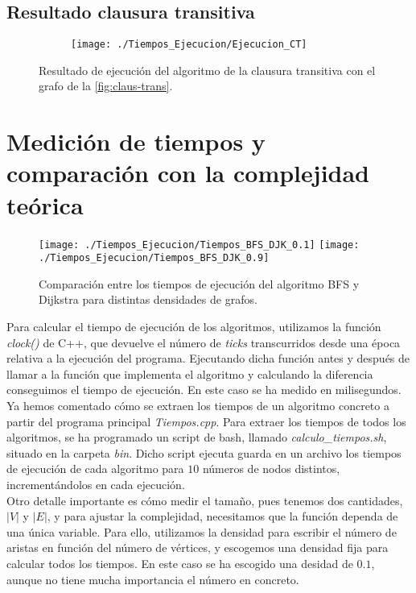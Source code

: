 \subsection{Resultado clausura transitiva}

\begin{figure}[!htb]
	\centering
	\begin{subfigure}{\linewidth}
		\texttt{[image: ./Tiempos\_Ejecucion/Ejecucion\_CT]}
	\end{subfigure}
	
	\caption{Resultado de ejecución del algoritmo de la clausura transitiva con el grafo de la \autoref{fig:claus-trans}.}
	\label{fig:resultado_CT}
\end{figure}

\section{Medición de tiempos y comparación con la complejidad teórica}

\begin{figure}[htb]
	\centering
	\texttt{[image: ./Tiempos\_Ejecucion/Tiempos\_BFS\_DJK\_0.1]}
	\texttt{[image: ./Tiempos\_Ejecucion/Tiempos\_BFS\_DJK\_0.9]}
	
	\caption{Comparación entre los tiempos de ejecución del algoritmo BFS y Dijkstra para distintas densidades de grafos.}
	\label{fig:BFS_DJK}
\end{figure}

Para calcular el tiempo de ejecución de los algoritmos, utilizamos la función \textit{clock()} de C++, que devuelve el número de \textit{ticks} transcurridos desde una época relativa a la ejecución del programa. Ejecutando dicha función antes y después de llamar a la función que implementa el algoritmo y calculando la diferencia conseguimos el tiempo de ejecución. En este caso se ha medido en milisegundos. \\

Ya hemos comentado cómo se extraen los tiempos de un algoritmo concreto a partir del programa principal \textit{Tiempos.cpp}. Para extraer los tiempos de todos los algoritmos, se ha programado un script de bash, llamado \textit{calculo\_tiempos.sh}, situado en la carpeta \textit{bin}. Dicho script ejecuta guarda en un archivo los tiempos de ejecución de cada algoritmo para $10$ números de nodos distintos, incrementándolos en cada ejecución. \\

Otro detalle importante es cómo medir el tamaño, pues tenemos dos cantidades, $|V|$ y $|E|$, y para ajustar la complejidad, necesitamos que la función dependa de una única variable. Para ello, utilizamos la densidad para escribir el número de aristas en función del número de vértices, y escogemos una densidad fija para calcular todos los tiempos. En este caso se ha escogido una desidad de $0.1$, aunque no tiene mucha importancia el número en concreto. \\

